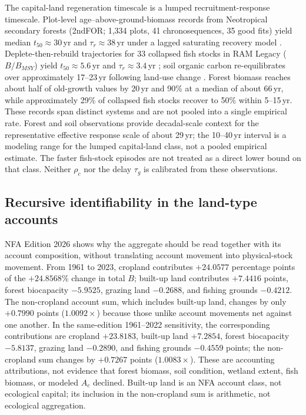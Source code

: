The capital-land regeneration timescale is a lumped recruitment-response timescale. Plot-level age--above-ground-biomass records from Neotropical secondary forests (2ndFOR; 1,334 plots, 41 chronosequences, 35 good fits) yield median $t_{50}\approx30$\,yr and $\tau_r\approx38$\,yr under a lagged saturating recovery model \citep{Poorter2016}. Deplete-then-rebuild trajectories for 33 collapsed fish stocks in RAM Legacy ($B/B_{MSY}$) yield $t_{50}\approx5.6$\,yr and $\tau_r\approx3.4$\,yr \citep{HutchingsReynolds2004,Neubauer2013}; soil organic carbon re-equilibrates over approximately 17--23\,yr following land-use change \citep{Poeplau2011}. Forest biomass reaches about half of old-growth values by 20\,yr and 90\% at a median of about 66\,yr, while approximately 29\% of collapsed fish stocks recover to 50\% within 5--15\,yr. These records span distinct systems and are not pooled into a single empirical rate. Forest and soil observations provide decadal-scale context for the representative effective response scale of about 29\,yr; the 10--40\,yr interval is a modeling range for the lumped capital-land class, not a pooled empirical estimate. The faster fish-stock episodes are not treated as a direct lower bound on that class. Neither $\rho_c$ nor the delay $\tau_g$ is calibrated from these observations.

\subsection{Recursive identifiability in the land-type accounts}\label{si:recursive}

NFA Edition 2026 shows why the aggregate should be read together with its account composition, without translating account movement into physical-stock movement. From 1961 to 2023, cropland contributes $+24.0577$ percentage points of the $+24.8568\%$ change in total $B$; built-up land contributes $+7.4416$ points, forest biocapacity $-5.9525$, grazing land $-0.2688$, and fishing grounds $-0.4212$. The non-cropland account sum, which includes built-up land, changes by only $+0.7990$ points ($1.0092\times$) because those unlike account movements net against one another. In the same-edition 1961--2022 sensitivity, the corresponding contributions are cropland $+23.8183$, built-up land $+7.2854$, forest biocapacity $-5.8137$, grazing land $-0.2890$, and fishing grounds $-0.4559$ points; the non-cropland sum changes by $+0.7267$ points ($1.0083\times$). These are accounting attributions, not evidence that forest biomass, soil condition, wetland extent, fish biomass, or modeled $A_c$ declined. Built-up land is an NFA account class, not ecological capital; its inclusion in the non-cropland sum is arithmetic, not ecological aggregation.

